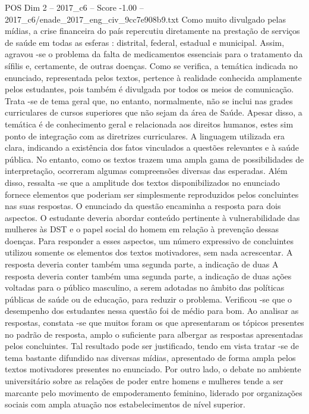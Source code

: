 \begin{textsample}{POS Dim 2 – 2017\_c6 – Score -1.00 – 2017\_c6/enade\_2017\_eng\_civ\_9cc7e908b9.txt}
Como muito divulgado pelas mídias, a crise financeira do país repercutiu diretamente na prestação de serviços de saúde em todas as esferas : distrital, federal, estadual e municipal.
Assim, agravou -se o problema da falta de medicamentos essenciais para o tratamento da sífilis e, certamente, de outras doenças.
Como se verifica, a temática indicada no enunciado, representada pelos textos, pertence à realidade conhecida amplamente pelos estudantes, pois também é divulgada por todos os meios de comunicação.
Trata -se de tema geral que, no entanto, normalmente, não se inclui nas grades curriculares de cursos superiores que não sejam da área de Saúde.
Apesar disso, a temática é de conhecimento geral e relacionada aos direitos humanos, estes sim ponto de integração com as diretrizes curriculares.
A linguagem utilizada era clara, indicando a existência dos fatos vinculados a questões relevantes e à saúde pública.
No entanto, como os textos trazem uma ampla gama de possibilidades de interpretação, ocorreram algumas compreensões diversas das esperadas.
Além disso, ressalta -se que a amplitude dos textos disponibilizados no enunciado fornece elementos que poderiam ser simplesmente reproduzidos pelos concluintes nas suas respostas.
O enunciado da questão encaminha a resposta para dois aspectos.
O estudante deveria abordar conteúdo pertinente à vulnerabilidade das mulheres às DST e o papel social do homem em relação à prevenção dessas doenças.
Para responder a esses aspectos, um número expressivo de concluintes utilizou somente os elementos dos textos motivadores, sem nada acrescentar.
A resposta deveria conter também uma segunda parte, a indicação de duas A resposta deveria conter também uma segunda parte, a indicação de duas ações voltadas para o público masculino, a serem adotadas no âmbito das políticas públicas de saúde ou de educação, para reduzir o problema.
Verificou -se que o desempenho dos estudantes nessa questão foi de médio para bom.
Ao analisar as respostas, constata -se que muitos foram os que apresentaram os tópicos presentes no padrão de resposta, amplo o suficiente para albergar as respostas apresentadas pelos concluintes.
Tal resultado pode ser justificado, tendo em vista tratar -se de tema bastante difundido nas diversas mídias, apresentado de forma ampla pelos textos motivadores presentes no enunciado.
Por outro lado, o debate no ambiente universitário sobre as relações de poder entre homens e mulheres tende a ser marcante pelo movimento de empoderamento feminino, liderado por organizações sociais com ampla atuação nos estabelecimentos de nível superior.

\end{textsample}
